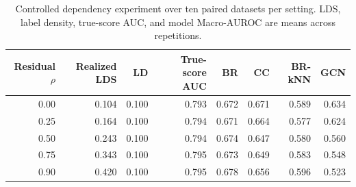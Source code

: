 \begin{table}[!t]
\centering
\caption{Controlled dependency experiment over ten paired datasets per setting. LDS, label density, true-score AUC, and model Macro-AUROC are means across repetitions.}
\label{tab:synthetic_r1}
\small
\begin{tabular}{rrrrrrrr}
\toprule
Residual $\rho$ & Realized LDS & LD & True-score AUC & BR & CC & BR-kNN & GCN \\
\midrule
0.00 & 0.104 & 0.100 & 0.793 & 0.672 & 0.671 & 0.589 & 0.634 \\
0.25 & 0.164 & 0.100 & 0.794 & 0.671 & 0.664 & 0.577 & 0.624 \\
0.50 & 0.243 & 0.100 & 0.794 & 0.674 & 0.647 & 0.580 & 0.560 \\
0.75 & 0.343 & 0.100 & 0.795 & 0.673 & 0.649 & 0.583 & 0.548 \\
0.90 & 0.420 & 0.100 & 0.795 & 0.678 & 0.656 & 0.596 & 0.523 \\
\bottomrule
\end{tabular}
\end{table}
